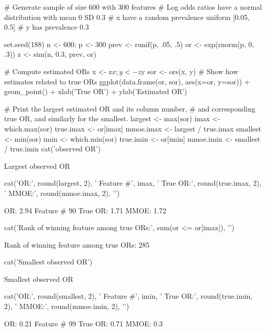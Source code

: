 \begin{Schunk}
\begin{Sinput}
# Generate sample of size 600 with 300 features
# Log odds ratios have a normal distribution with mean 0 SD 0.3
# x have a random prevalence uniform [0.05, 0.5]
# y has prevalence 0.3

set.seed(188)	
n <- 600; p <- 300
prev <- runif(p, .05, .5)
or   <- exp(rnorm(p, 0, .3))
z    <- sim(n, 0.3, prev, or)

# Compute estimated ORs
x <- z$x;   y <- z$y
sor <- ors(x, y)
# Show how estimates related to true ORs
ggplot(data.frame(or, sor), aes(x=or, y=sor)) + geom_point() +
  xlab('True OR') + ylab('Estimated OR')

# Print the largest estimated OR and its column number,
# and corresponding true OR, and similarly for the smallest.
largest   <- max(sor)
imax      <- which.max(sor)
true.imax <- or[imax]
mmoe.imax <- largest / true.imax
smallest  <- min(sor)
imin      <- which.min(sor)
true.imin <- or[imin]
mmoe.imin <- smallest / true.imin
cat('\nLargest observed OR\n')
\end{Sinput}
\begin{Soutput}

Largest observed OR
\end{Soutput}
\begin{Sinput}
cat('OR:', round(largest, 2), '  Feature #', imax, '  True OR:',
    round(true.imax, 2), '  MMOE:', round(mmoe.imax, 2), '\n')
\end{Sinput}
\begin{Soutput}
OR: 2.94   Feature # 90   True OR: 1.71   MMOE: 1.72 
\end{Soutput}
\begin{Sinput}
cat('Rank of winning feature among true ORs:', sum(or <= or[imax]), '\n\n')
\end{Sinput}
\begin{Soutput}
Rank of winning feature among true ORs: 285 
\end{Soutput}
\begin{Sinput}
cat('Smallest observed OR\n')
\end{Sinput}
\begin{Soutput}
Smallest observed OR
\end{Soutput}
\begin{Sinput}
cat('OR:', round(smallest, 2), '  Feature #', imin, '  True OR:',
    round(true.imin, 2), '  MMOE:', round(mmoe.imin, 2), '\n')
\end{Sinput}
\begin{Soutput}
OR: 0.21   Feature # 99   True OR: 0.71   MMOE: 0.3 
\end{Soutput}



\end{Schunk}
